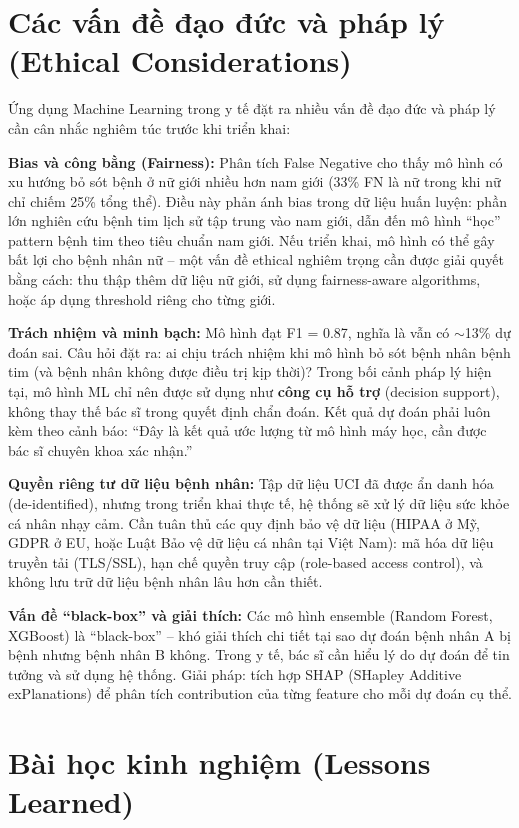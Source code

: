 \section{Các vấn đề đạo đức và pháp lý (Ethical Considerations)}

Ứng dụng Machine Learning trong y tế đặt ra nhiều vấn đề đạo đức và pháp lý cần cân nhắc nghiêm túc trước khi triển khai:

\textbf{Bias và công bằng (Fairness):} Phân tích False Negative cho thấy mô hình có xu hướng bỏ sót bệnh ở nữ giới nhiều hơn nam giới (33\% FN là nữ trong khi nữ chỉ chiếm 25\% tổng thể). Điều này phản ánh bias trong dữ liệu huấn luyện: phần lớn nghiên cứu bệnh tim lịch sử tập trung vào nam giới, dẫn đến mô hình ``học'' pattern bệnh tim theo tiêu chuẩn nam giới. Nếu triển khai, mô hình có thể gây bất lợi cho bệnh nhân nữ -- một vấn đề ethical nghiêm trọng cần được giải quyết bằng cách: thu thập thêm dữ liệu nữ giới, sử dụng fairness-aware algorithms, hoặc áp dụng threshold riêng cho từng giới.

\textbf{Trách nhiệm và minh bạch:} Mô hình đạt F1 = 0.87, nghĩa là vẫn có $\sim$13\% dự đoán sai. Câu hỏi đặt ra: ai chịu trách nhiệm khi mô hình bỏ sót bệnh nhân bệnh tim (và bệnh nhân không được điều trị kịp thời)? Trong bối cảnh pháp lý hiện tại, mô hình ML chỉ nên được sử dụng như \textbf{công cụ hỗ trợ} (decision support), không thay thế bác sĩ trong quyết định chẩn đoán. Kết quả dự đoán phải luôn kèm theo cảnh báo: ``Đây là kết quả ước lượng từ mô hình máy học, cần được bác sĩ chuyên khoa xác nhận.''

\textbf{Quyền riêng tư dữ liệu bệnh nhân:} Tập dữ liệu UCI đã được ẩn danh hóa (de-identified), nhưng trong triển khai thực tế, hệ thống sẽ xử lý dữ liệu sức khỏe cá nhân nhạy cảm. Cần tuân thủ các quy định bảo vệ dữ liệu (HIPAA ở Mỹ, GDPR ở EU, hoặc Luật Bảo vệ dữ liệu cá nhân tại Việt Nam): mã hóa dữ liệu truyền tải (TLS/SSL), hạn chế quyền truy cập (role-based access control), và không lưu trữ dữ liệu bệnh nhân lâu hơn cần thiết.

\textbf{Vấn đề ``black-box'' và giải thích:} Các mô hình ensemble (Random Forest, XGBoost) là ``black-box'' -- khó giải thích chi tiết tại sao dự đoán bệnh nhân A bị bệnh nhưng bệnh nhân B không. Trong y tế, bác sĩ cần hiểu lý do dự đoán để tin tưởng và sử dụng hệ thống. Giải pháp: tích hợp SHAP (SHapley Additive exPlanations) để phân tích contribution của từng feature cho mỗi dự đoán cụ thể.

\section{Bài học kinh nghiệm (Lessons Learned)}

